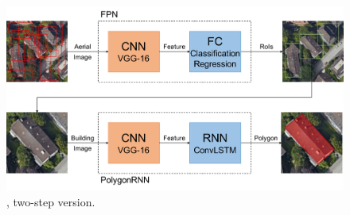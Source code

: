 \begin{figure}[!h]
	\centering
	\includegraphics[width=\fig\textwidth]{3-15.pdf}
    \caption[\modelnameshort, two-step version]{\modelnameshort, two-step version.}
    \label{fig:stpmod}
\end{figure}
